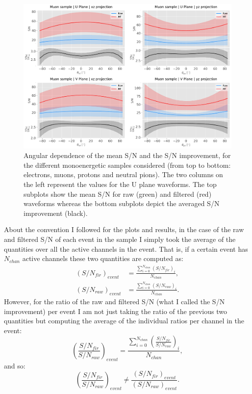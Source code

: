 \begin{figure}[t]
	\centering
	\includegraphics[width=0.9\linewidth]{Images/Matched_Filter/larsoft_muon_angular.pdf}
	\caption{Angular dependence of the mean S/N and the S/N improvement, for the different monoenergetic samples considered (from top to bottom: electrons, muons, protons and neutral pions). The two columns on the left represent the values for the U plane waveforms. The top subplots show the mean S/N for raw (green) and filtered (red) waveforms whereas the bottom subplots depict the averaged S/N improvement (black).}
	\label{fig:angular_muon}
\end{figure}

About the convention I followed for the plots and results, in the case of the raw and filtered S/N of each event in the sample I simply took the average of the quantities over all the active channels in the event. That is, if a certain event has $N_{chan}$ active channels these two quantities are computed as:
\begin{equation}
\begin{split}
\left(S/N_{fir}\right)_{event} &= \frac{\sum_{i=0}^{N_{chan}} \left(S/N_{fir}\right)_{i}}{N_{chan}},\\
\left(S/N_{raw}\right)_{event} &= \frac{\sum_{i=0}^{N_{chan}} \left(S/N_{raw}\right)_{i}}{N_{chan}}.
\end{split}
\end{equation}
However, for the ratio of the raw and filtered S/N (what I called the S/N improvement) per event I am not just taking the ratio of the previous two quantities but computing the average of the individual ratios per channel in the event:
\begin{equation}
\left(\frac{S/N_{fir}}{S/N_{raw}}\right)_{event} = \frac{\sum_{i=0}^{N_{chan}} \left(\frac{S/N_{fir}}{S/N_{raw}}\right)_{i}}{N_{chan}},
\end{equation}
and so:
\begin{equation}
\left(\frac{S/N_{fir}}{S/N_{raw}}\right)_{event}  \neq \frac{\left(S/N_{fir}\right)_{event}}{\left(S/N_{raw}\right)_{event}}.
\end{equation}

